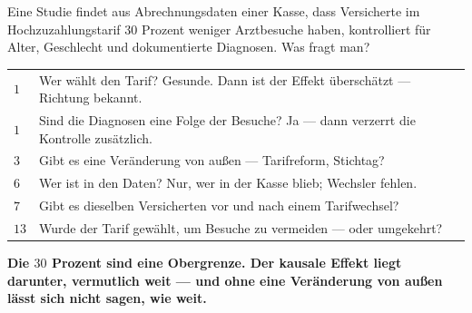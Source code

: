 \begin{aufgabe}
Eine Studie findet aus Abrechnungsdaten einer Kasse, dass Versicherte im Hochzuzahlungstarif $30$ Prozent weniger Arztbesuche haben, kontrolliert für Alter, Geschlecht und dokumentierte Diagnosen. Was fragt man?

\loesung
{}
\begin{center}
{\small
\renewcommand{\arraystretch}{1.5}
\begin{tabular}{@{}P{0.9cm}P{7.5cm}@{}}
\toprule
$1$ & Wer wählt den Tarif? Gesunde. Dann ist der Effekt überschätzt --- Richtung bekannt.\\
$1$ & Sind die Diagnosen eine Folge der Besuche? Ja --- dann verzerrt die Kontrolle zusätzlich.\\
$3$ & Gibt es eine Veränderung von außen --- Tarifreform, Stichtag?\\
$6$ & Wer ist in den Daten? Nur, wer in der Kasse blieb; Wechsler fehlen.\\
$7$ & Gibt es dieselben Versicherten vor und nach einem Tarifwechsel?\\
$13$ & Wurde der Tarif gewählt, um Besuche zu vermeiden --- oder umgekehrt?\\
\bottomrule
\end{tabular}}
\end{center}

\begin{center}
\begin{minipage}{0.9\textwidth}
\textbf{Die $30$ Prozent sind eine Obergrenze. Der kausale Effekt liegt darunter, vermutlich weit --- und ohne eine Veränderung von außen lässt sich nicht sagen, wie weit.}
\end{minipage}
\end{center}

\begin{center}
\begin{minipage}{0.88\textwidth}
\end{minipage}
\end{center}
\end{aufgabe}

